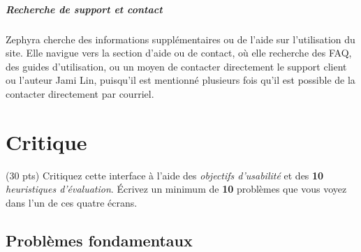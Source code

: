 \documentclass[9pt]{report}
\begin{document}
\begin{multicols*}{2}
  \paragraph{Recherche de support et contact}
  Zephyra cherche des informations supplémentaires ou de l'aide sur 
  l'utilisation du site. Elle navigue vers la section d'aide ou de 
  contact, où elle recherche des FAQ, des guides d'utilisation, ou 
  un moyen de contacter directement le support client ou l'auteur Jami Lin, 
  puisqu'il est mentionné plusieurs fois qu'il est possible de la 
  contacter directement par courriel. 

  \chapter{Critique}
  \begin{Exercice}{(30 pts)}{}
    Critiquez cette interface à l’aide des \textit{objectifs d’usabilité} et des 
  \textbf{10} \textit{heuristiques d’évaluation}. Écrivez un minimum 
  de \textbf{10} problèmes que vous voyez dans l’un de ces quatre écrans.     
  \end{Exercice}

  \section{Problèmes fondamentaux}



  




  \vspace{-1em}









\end{multicols*}
\end{document}
